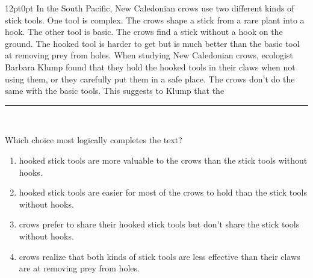 \documentclass[11pt, twocolumn]{article}
\newcounter{questionnum}
\begin{document}
\vspace{6pt}\noindent
\begin{minipage}{\columnwidth}\raggedright
\noindent{}\par\vspace{8pt}
\begin{adjustwidth}{12pt}{0pt}
In the South Pacific, New Caledonian crows use two different kinds of stick tools. One tool is complex. The crows shape a stick from a rare plant into a hook. The other tool is basic. The crows find a stick without a hook on the ground. The hooked tool is harder to get but is much better than the basic tool at removing prey from holes. When studying New Caledonian crows, ecologist Barbara Klump found that they hold the hooked tools in their claws when not using them, or they carefully put them in a safe place. The crows don't do the same with the basic tools. This suggests to Klump that the \,\rule{2cm}{0.4pt}\,
\vspace{6pt}

Which choice most logically completes the text?
\begin{enumerate}[label=\Alph*),leftmargin=18pt,topsep=3pt,itemsep=2pt]
  \item hooked stick tools are more valuable to the crows than the stick tools without hooks.
  \item hooked stick tools are easier for most of the crows to hold than the stick tools without hooks.
  \item crows prefer to share their hooked stick tools but don't share the stick tools without hooks.
  \item crows realize that both kinds of stick tools are less effective than their claws are at removing prey from holes.
\end{enumerate}
\end{adjustwidth}
\end{minipage}\par
\end{document}
